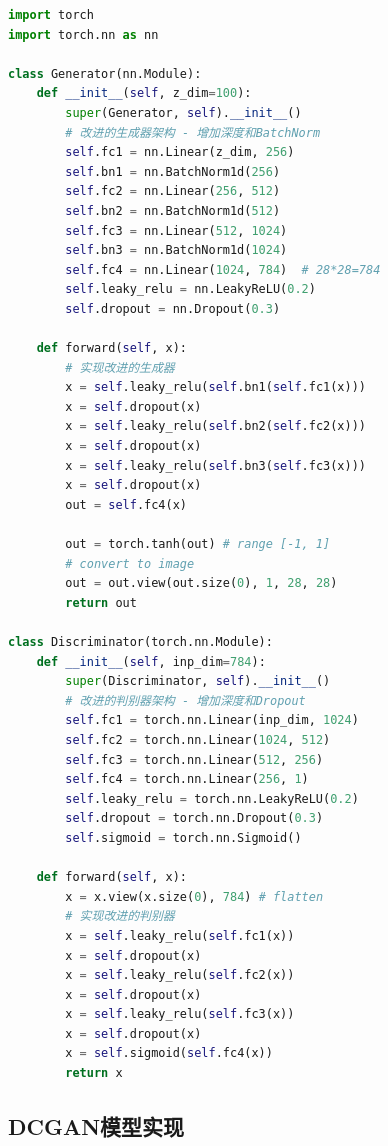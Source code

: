 \documentclass[UTF8]{ctexart}
\begin{document}
\begin{lstlisting}[language=Python, caption=原始GAN生成器和判别器]
import torch
import torch.nn as nn

class Generator(nn.Module):
    def __init__(self, z_dim=100):
        super(Generator, self).__init__()
        # 改进的生成器架构 - 增加深度和BatchNorm
        self.fc1 = nn.Linear(z_dim, 256)
        self.bn1 = nn.BatchNorm1d(256)
        self.fc2 = nn.Linear(256, 512)
        self.bn2 = nn.BatchNorm1d(512)
        self.fc3 = nn.Linear(512, 1024)
        self.bn3 = nn.BatchNorm1d(1024)
        self.fc4 = nn.Linear(1024, 784)  # 28*28=784
        self.leaky_relu = nn.LeakyReLU(0.2)
        self.dropout = nn.Dropout(0.3)

    def forward(self, x):
        # 实现改进的生成器
        x = self.leaky_relu(self.bn1(self.fc1(x)))
        x = self.dropout(x)
        x = self.leaky_relu(self.bn2(self.fc2(x)))
        x = self.dropout(x)
        x = self.leaky_relu(self.bn3(self.fc3(x)))
        x = self.dropout(x)
        out = self.fc4(x)
        
        out = torch.tanh(out) # range [-1, 1]
        # convert to image 
        out = out.view(out.size(0), 1, 28, 28)
        return out

class Discriminator(torch.nn.Module):
    def __init__(self, inp_dim=784):
        super(Discriminator, self).__init__()
        # 改进的判别器架构 - 增加深度和Dropout
        self.fc1 = torch.nn.Linear(inp_dim, 1024)
        self.fc2 = torch.nn.Linear(1024, 512)
        self.fc3 = torch.nn.Linear(512, 256)
        self.fc4 = torch.nn.Linear(256, 1)
        self.leaky_relu = torch.nn.LeakyReLU(0.2)
        self.dropout = torch.nn.Dropout(0.3)
        self.sigmoid = torch.nn.Sigmoid()
        
    def forward(self, x):
        x = x.view(x.size(0), 784) # flatten
        # 实现改进的判别器
        x = self.leaky_relu(self.fc1(x))
        x = self.dropout(x)
        x = self.leaky_relu(self.fc2(x))
        x = self.dropout(x)
        x = self.leaky_relu(self.fc3(x))
        x = self.dropout(x)
        x = self.sigmoid(self.fc4(x))
        return x
\end{lstlisting}

\subsection{DCGAN模型实现}
\end{document}
